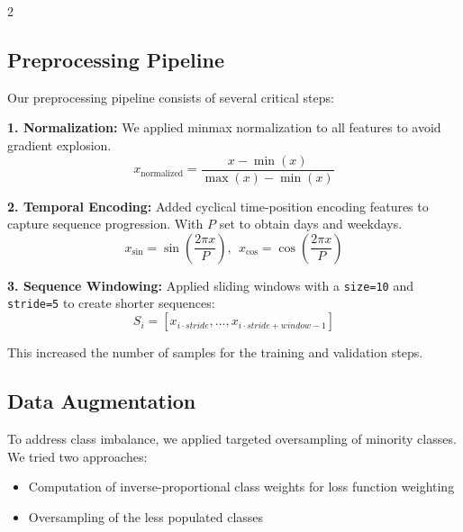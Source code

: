 \documentclass[11pt]{article}
\begin{document}
\begin{multicols}{2}

        \subsection{Preprocessing Pipeline}
        Our preprocessing pipeline consists of several critical steps:
            
        \textbf{1. Normalization:} We applied minmax normalization to all features to avoid gradient explosion.
        $$x_{\text{normalized}} = \frac{x - \min(x)}{\max(x) - \min(x)}$$
        
        \textbf{2. Temporal Encoding:}
        Added cyclical time-position encoding features to capture sequence progression. With $P$ set to obtain days and weekdays.
        $$x_{\sin} = \sin\left(\frac{2\pi x}{P}\right) , \ \ x_{\cos} = \cos\left(\frac{2\pi x}{P}\right)$$

        
        \textbf{3. Sequence Windowing:}
        Applied sliding windows with a \texttt{size=10} and \texttt{stride=5} to create shorter sequences:
        \begin{equation}
            S_i = [x_{i \cdot stride}, ..., x_{i \cdot stride + window-1}]
        \end{equation}
        
        This increased the number of samples for the training and validation steps.

         \subsection{Data Augmentation}
        To address class imbalance, we applied targeted oversampling of minority classes. We tried two approaches:
        \begin{itemize}
            \setlength{\itemsep}{1pt}
            \setlength{\parskip}{0pt}
            \setlength{\parsep}{0pt}
            \item Computation of inverse-proportional class weights for loss function weighting
            \item Oversampling of the less populated classes
        \end{itemize}
        

\end{multicols}
\end{document}

